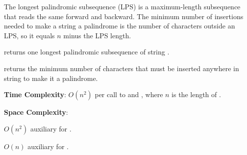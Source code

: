The longest palindromic subsequence (LPS) is a maximum-length subsequence that reads the same forward and backward. The minimum number of insertions needed to make a string a palindrome is the number of characters outside an LPS, so it equals $n$ minus the LPS length.

\begin{compactitem}
  \item {} returns one longest palindromic subsequence of string .
  \item {} returns the minimum number of characters that must be inserted anywhere in string  to make it a palindrome.
\end{compactitem}

\textbf{Time Complexity}: $O(n^{2})$ per call to  and , where $n$ is the length of .

\textbf{Space Complexity}:
\begin{compactitem}
  \item $O(n^{2})$ auxiliary for .
  \item $O(n)$ auxiliary for .
\end{compactitem}

